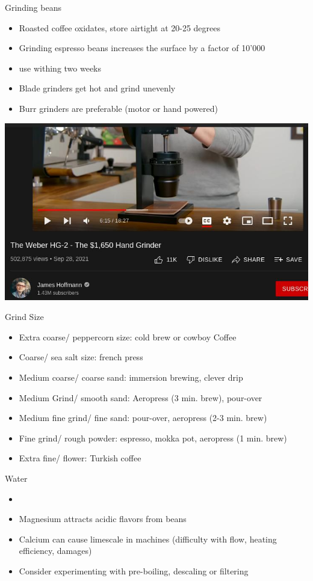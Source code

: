 \documentclass[10pt,graphics,aspectratio=169,table]{beamer}
\begin{document}
\begin{frame}{Grinding beans}
    \begin{itemize}
        \item Roasted coffee oxidates, store airtight at 20-25 degrees
        \item Grinding espresso beans increases the surface by a factor of 10'000
        \item use withing two weeks
        \item Blade grinders get hot and grind unevenly
        \item Burr grinders are preferable (motor or hand powered)
    \end{itemize}
    \includegraphics[scale=0.35]{img/Screenshot_handgrinder.jpg} \cite{expensiveGrinder}
\end{frame}

\begin{frame}{Grind  Size}
\begin{itemize}
    \item Extra coarse/ peppercorn size: cold brew or cowboy Coffee
    \item Coarse/ sea salt size: french press
    \item Medium coarse/ coarse sand: immersion brewing, clever drip
    \item Medium Grind/ smooth sand: Aeropress (3 min. brew), pour-over
    \item Medium fine grind/ fine sand: pour-over, aeropress (2-3 min. brew)
    \item Fine grind/ rough powder: espresso, mokka pot, aeropress (1 min. brew) 
    \item Extra fine/ flower: Turkish coffee
\end{itemize}
    
\end{frame}
\begin{frame}{Water}
    \begin{itemize}
        \item {}
        \item Magnesium attracts acidic flavors from beans
        \item Calcium can cause limescale in machines (difficulty with flow, heating efficiency, damages)
        \item Consider experimenting with pre-boiling, descaling or filtering
    \end{itemize}
\end{frame}
\end{document}
